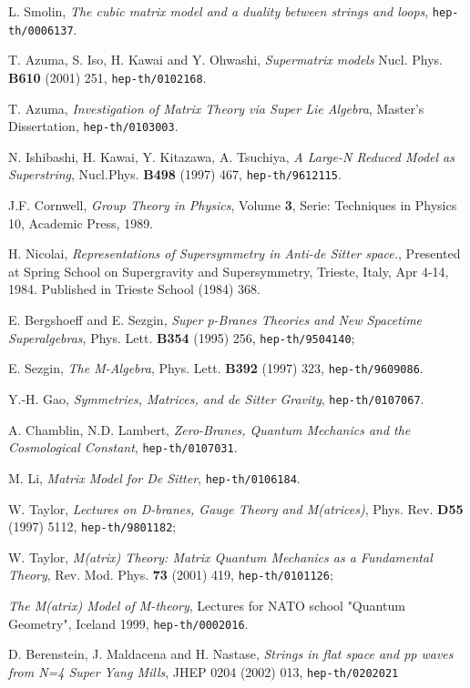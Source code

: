 \documentclass[a4paper,11pt]{article}
\begin{document}
\begin{thebibliography}{99}
L. Smolin, {\it The cubic matrix model and a duality between strings and loops},
{\tt hep-th/0006137}.

T. Azuma, S. Iso, H. Kawai and Y. Ohwashi, {\it Supermatrix models}
Nucl. Phys. {\bf B610} (2001) 251, {\tt hep-th/0102168}.

T. Azuma, {\it Investigation of Matrix Theory via Super Lie Algebra},
Master's Dissertation, {\tt hep-th/0103003}.

N. Ishibashi, H. Kawai, Y. Kitazawa, A. Tsuchiya, {\it A Large-N Reduced Model as Superstring},
Nucl.Phys. {\bf B498} (1997) 467, {\tt hep-th/9612115}. 

J.F. Cornwell, {\it Group Theory in Physics}, Volume {\bf 3}, Serie: Techniques in Physics 10,
Academic Press, 1989.

H. Nicolai, {\it Representations of Supersymmetry in Anti-de Sitter space.}, 
Presented at Spring School on Supergravity and Supersymmetry, Trieste, Italy, Apr 4-14, 1984. 
Published in Trieste School (1984) 368. 

E. Bergshoeff and E. Sezgin, {\it Super p-Branes Theories and New Spacetime Superalgebras},
Phys. Lett. {\bf B354} (1995) 256, {\tt hep-th/9504140};

E. Sezgin, {\it The M-Algebra},
Phys. Lett. {\bf B392} (1997) 323, {\tt hep-th/9609086}.

Y.-H. Gao, {\it Symmetries, Matrices, and de Sitter Gravity},
{\tt hep-th/0107067}.

A. Chamblin, N.D. Lambert, {\it Zero-Branes, Quantum Mechanics and the Cosmological Constant},
{\tt hep-th/0107031}.

M. Li, {\it Matrix Model for De Sitter}, {\tt hep-th/0106184}. 

W. Taylor, {\it Lectures on D-branes, Gauge Theory and M(atrices)},
Phys. Rev. {\bf D55} (1997) 5112, {\tt hep-th/9801182};

W. Taylor, {\it M(atrix) Theory: Matrix Quantum Mechanics as a Fundamental Theory},
Rev. Mod. Phys. {\bf 73} (2001) 419, {\tt hep-th/0101126};

{\it The M(atrix) Model of M-theory},
Lectures for NATO school "Quantum Geometry", Iceland 1999, {\tt hep-th/0002016}.

D. Berenstein, J. Maldacena and H. Nastase,
{\it Strings in flat space and pp waves from {\cal N}=4 Super Yang Mills},
JHEP 0204 (2002) 013, {\tt hep-th/0202021}


\end{thebibliography}
\end{document}
